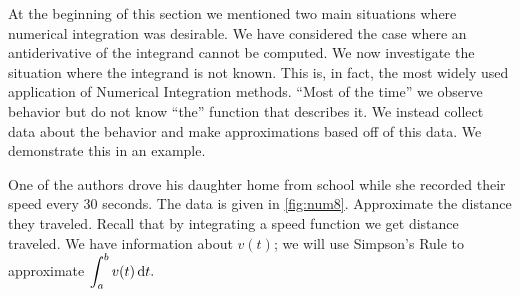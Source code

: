 At the beginning of this section we mentioned two main situations where numerical integration was desirable. We have considered the case where an antiderivative of the integrand cannot be computed. We now investigate the situation where the integrand is not known. This is, in fact, the most widely used application of Numerical Integration methods. ``Most of the time'' we observe behavior but do not know ``the'' function that describes it. We instead collect data about the behavior and make approximations based off of this data. We demonstrate this in an example.

\begin{example}\label{ex_num8}%
One of the authors drove his daughter home from school while she recorded their speed every 30 seconds. The data is given in \autoref{fig:num8}.
%
%
Approximate the distance they traveled.
\solution
Recall that by integrating a speed function we get distance traveled. We have information about $v(t)$; we will use Simpson's Rule to approximate $\displaystyle \int_a^b v(t)\operatorname{d}\! t.$ 


\end{example}

